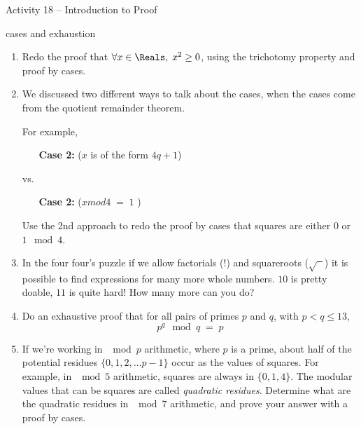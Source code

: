 \documentclass{amsart}
\begin{document}
\thispagestyle{empty}

\centerline{\Large Activity 18 -- Introduction to Proof}
\centerline{\large cases and exhaustion}

\bigskip
\Large


\begin{enumerate}

\item Redo the proof that $\forall x \in \Reals, \; x^2 \geq 0$, using the trichotomy property and proof by cases. 

\vfill

\item We discussed two different ways to talk about the cases, when the cases come from the quotient remainder theorem.

For example,

\begin{itemize}
\item[\bf Case 2:] ($x$ is of the form $4q+1$)
\end{itemize}
\noindent vs.
\begin{itemize}
\item[\bf Case 2:] ($x mod 4 \; = \; 1$ )
\end{itemize}

Use the 2nd approach to redo the proof by cases that squares are either $0$ or $1 \mod 4$.

\vfill

\newpage

\item In the four four's puzzle if we allow factorials ($!$) and squareroots ($\sqrt{\phantom{x}}$) it is possible to find expressions for many more whole numbers.  $10$ is pretty doable, $11$ is quite hard!  How many more can you do?

\vfill

\item Do an exhaustive proof that for all pairs of primes $p$ and $q$, with $p < q \leq 13$, 
\[ p^q \mod{q} \; = \; p  \]

\vfill

\newpage

\item If we're working in $\!\!\mod{p}$ arithmetic, where $p$ is a prime, about half of the potential residues $\{0,1,2, \ldots p-1\}$ occur as the values of squares.  For example, in $\mod{5}$ arithmetic, squares are always in $\{0,1,4\}$.  The modular values that can be squares are called {\em quadratic residues}.  Determine what are the quadratic residues in $\mod{7}$ arithmetic, and prove your answer with a proof by cases.


\end{enumerate}
\end{document}
